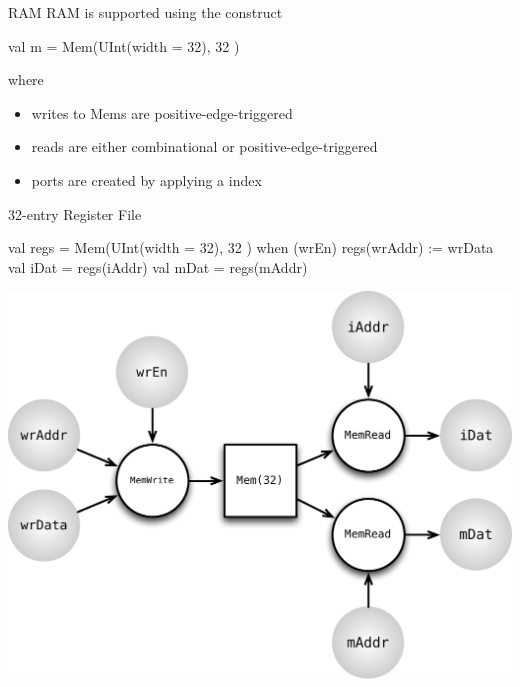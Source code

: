 \documentclass[xcolor=pdflatex,dvipsnames,table]{beamer}
\begin{document}
\begin{frame}[fragile]{RAM}
RAM is supported using the  construct

\begin{scala}
val m = Mem(UInt(width = 32), 32 )
\end{scala}

\noindent
where
\begin{itemize}
\item writes to Mems are positive-edge-triggered
\item reads are either combinational or positive-edge-triggered
\item ports are created by applying a  index
\end{itemize}
\end{frame}

\begin{frame}[fragile]{32-entry Register File}

\begin{scala}
val regs = Mem(UInt(width = 32), 32 )
when (wrEn) {
  regs(wrAddr) := wrData
}
val iDat = regs(iAddr)
val mDat = regs(mAddr)
\end{scala}

\begin{center}
\includegraphics[height=0.55\textheight]{figs/mem.pdf} 
\end{center}

\end{frame}
\end{document}
